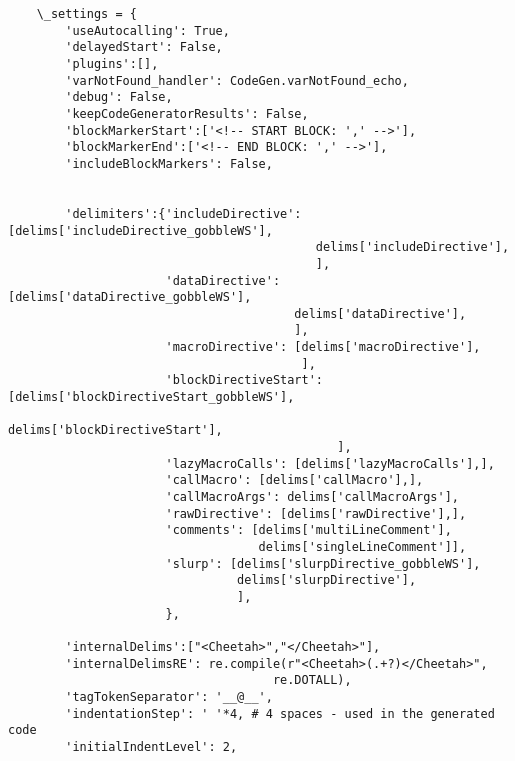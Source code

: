 \begin{verbatim}
    \_settings = {
        'useAutocalling': True,
        'delayedStart': False,            
        'plugins':[],
        'varNotFound_handler': CodeGen.varNotFound_echo,
        'debug': False,
        'keepCodeGeneratorResults': False,
        'blockMarkerStart':['<!-- START BLOCK: ',' -->'],
        'blockMarkerEnd':['<!-- END BLOCK: ',' -->'],
        'includeBlockMarkers': False,


        'delimiters':{'includeDirective': [delims['includeDirective_gobbleWS'],
                                           delims['includeDirective'],
                                           ],
                      'dataDirective': [delims['dataDirective_gobbleWS'],
                                        delims['dataDirective'],
                                        ],
                      'macroDirective': [delims['macroDirective'],
                                         ],
                      'blockDirectiveStart': [delims['blockDirectiveStart_gobbleWS'],
                                              delims['blockDirectiveStart'],
                                              ],
                      'lazyMacroCalls': [delims['lazyMacroCalls'],],
                      'callMacro': [delims['callMacro'],],
                      'callMacroArgs': delims['callMacroArgs'],
                      'rawDirective': [delims['rawDirective'],],
                      'comments': [delims['multiLineComment'],
                                   delims['singleLineComment']],
                      'slurp': [delims['slurpDirective_gobbleWS'],
                                delims['slurpDirective'],
                                ],
                      },
       
        'internalDelims':["<Cheetah>","</Cheetah>"],
        'internalDelimsRE': re.compile(r"<Cheetah>(.+?)</Cheetah>",
                                     re.DOTALL),
        'tagTokenSeparator': '__@__',
        'indentationStep': ' '*4, # 4 spaces - used in the generated code
        'initialIndentLevel': 2, 
            

\end{verbatim}
